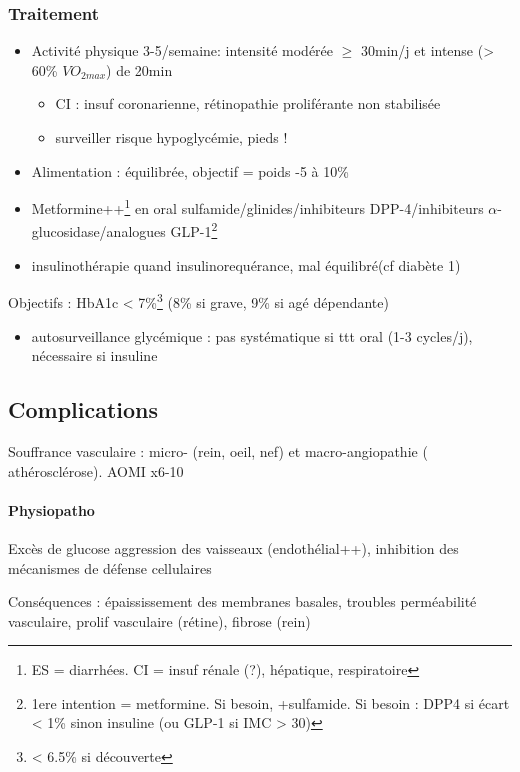 \documentclass{book}
\begin{document}
\subsubsection{Traitement}
\label{sec:org44dc419}
\begin{itemize}
\item Activité physique 3-5/semaine: intensité modérée \(\ge\) 30min/j et intense (> 60\% \(VO_{2max}\)) de 20min
\begin{itemize}
\item CI : insuf coronarienne, rétinopathie proliférante non stabilisée
\item surveiller risque hypoglycémie, pieds !
\end{itemize}
\item Alimentation : équilibrée, objectif = poids -5 à 10\%
\item Metformine++\footnote{ES = diarrhées. CI = insuf rénale (?), hépatique, respiratoire} en oral \textpm{} sulfamide/glinides/inhibiteurs
DPP-4/inhibiteurs \(\alpha\)-glucosidase/analogues GLP-1\footnote{1ere intention = metformine. Si besoin, +sulfamide. Si besoin : DPP4 si
écart < 1\% sinon insuline (ou GLP-1 si IMC > 30)}
\item \textpm{} insulinothérapie quand insulinorequérance, mal équilibré(cf diabète 1)
\end{itemize}
Objectifs : HbA1c < 7\%\footnote{< 6.5\% si découverte} (8\% si grave, 9\% si agé dépendante)
\begin{itemize}
\item autosurveillance glycémique : pas systématique si ttt oral (1-3 cycles/j),
nécessaire si insuline
\end{itemize}

\subsection{Complications}
\label{sec:org594d103}
Souffrance vasculaire : micro- (rein, oeil, nef) et macro-angiopathie (\inc
athérosclérose). AOMI x6-10

\paragraph{Physiopatho}
\label{sec:orga835623}
Excès de glucose \thus aggression des vaisseaux (endothélial++), inhibition des
mécanismes de défense cellulaires

Conséquences : épaississement des membranes basales, troubles perméabilité
vasculaire, prolif vasculaire (rétine), fibrose (rein)
\end{document}
